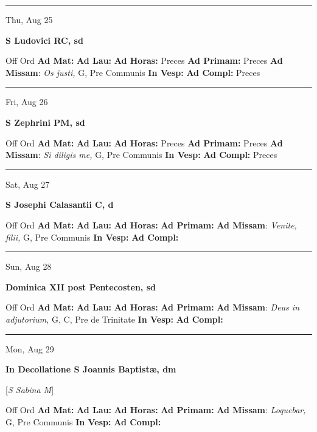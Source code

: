 \documentclass[letterpaper, 10pt]{article}
\begin{document}
\hrule
\begin{center}
Thu, Aug 25
\end{center}\textbf{ \large S Ludovici RC, \textnormal{\normalsize sd}}
\begin{justify}
Off Ord
\textbf{Ad Mat: }
\textbf{Ad Lau: }
\textbf{Ad Horas: }Preces
\textbf{Ad Primam: }Preces
\textbf{Ad Missam}: \textit{Os justi,} G, Pre Communis
\textbf{In Vesp: }
\textbf{Ad Compl: }Preces\end{justify}



\hrule
\begin{center}
Fri, Aug 26
\end{center}\textbf{ \large S Zephrini PM, \textnormal{\normalsize sd}}
\begin{justify}
Off Ord
\textbf{Ad Mat: }
\textbf{Ad Lau: }
\textbf{Ad Horas: }Preces
\textbf{Ad Primam: }Preces
\textbf{Ad Missam}: \textit{Si diligis me,} G, Pre Communis
\textbf{In Vesp: }
\textbf{Ad Compl: }Preces\end{justify}



\hrule
\begin{center}
Sat, Aug 27
\end{center}\textbf{ \large S Josephi Calasantii C, \textnormal{\normalsize d}}
\begin{justify}
Off Ord
\textbf{Ad Mat: }
\textbf{Ad Lau: }
\textbf{Ad Horas: }
\textbf{Ad Primam: }
\textbf{Ad Missam}: \textit{Venite, filii,} G, Pre Communis
\textbf{In Vesp: }
\textbf{Ad Compl: }\end{justify}



\hrule
\begin{center}
Sun, Aug 28
\end{center}\textbf{ \large Dominica XII post Pentecosten, \textnormal{\normalsize sd}}
\begin{justify}
Off Ord
\textbf{Ad Mat: }
\textbf{Ad Lau: }
\textbf{Ad Horas: }
\textbf{Ad Primam: }
\textbf{Ad Missam}: \textit{Deus in adjutorium,} G, C, Pre de Trinitate
\textbf{In Vesp: }
\textbf{Ad Compl: }\end{justify}



\hrule
\begin{center}
Mon, Aug 29
\end{center}\textbf{ \large In Decollatione S Joannis Baptistæ, \textnormal{\normalsize dm}}

[\textit{S Sabina M}]
\begin{justify}
Off Ord
\textbf{Ad Mat: }
\textbf{Ad Lau: }
\textbf{Ad Horas: }
\textbf{Ad Primam: }
\textbf{Ad Missam}: \textit{Loquebar,} G, Pre Communis
\textbf{In Vesp: }
\textbf{Ad Compl: }\end{justify}
\end{document}
